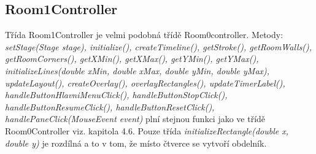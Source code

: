 \subsection{Room1Controller}
Třída Room1Controller je velmi podobná třídě Room0controller. Metody: \textit{setStage(Stage stage), initialize(), createTimeline(), getStroke(), getRoomWalls(), getRoomCorners(), getXMin(), getXMax(), getYMin(), getYMax(), initializeLines(double xMin, double xMax, double yMin, double yMax), updateLayout(), createOverlay(), overlayRectangles(), updateTimerLabel(), handleButtonHlavniMenuClick(), handleButtonStopClick(), handleButtonResumeClick(), handleButtonResetClick(), handlePaneClick(MouseEvent event)} plní stejnou funkci jako ve třídě Room0Controller viz. kapitola 4.6. Pouze třída \textit{initializeRectangle(double x, double y)} je rozdílná a to v tom, že místo čtverce se vytvoří obdelník.